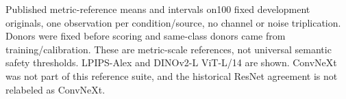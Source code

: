 Published metric-reference means and intervals on100 fixed development originals, one observation per condition/source, no channel or noise triplication. Donors were fixed before scoring and same-class donors came from training/calibration. These are metric-scale references, not universal semantic safety thresholds. LPIPS-Alex and DINOv2-L ViT-L/14 are shown. ConvNeXt was not part of this reference suite, and the historical ResNet agreement is not relabeled as ConvNeXt.
